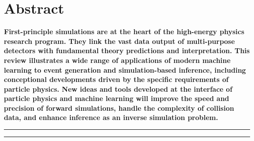 \documentclass[submission,Phys]{SciPost}
\newcommand\snowmass{\begin{center}\rule[-0.2in]{\hsize}{0.01in}\\\rule{\hsize}{0.01in}\\
\vskip 0.1in Submitted to the  Proceedings of the US Community Study\\ 
on the Future of Particle Physics (Snowmass)
\rule{\hsize}{0.01in}\\\rule[+0.2in]{\hsize}{0.01in} \end{center}}
\begin{document}
\section*{Abstract}
         {\bf First-principle simulations are at the heart of the high-energy physics research program. They link the vast data output of multi-purpose detectors with fundamental theory predictions and interpretation. This review illustrates a wide range of applications of modern machine learning to event generation and simulation-based inference, including conceptional developments driven by the specific requirements of particle physics. New ideas and tools developed at the interface of particle physics and machine learning will improve the speed and precision of forward simulations, handle the complexity of collision data, and enhance inference as an inverse simulation problem.}

\bigskip\bigskip\bigskip


\clearpage 

\vspace{10pt}
\noindent\rule{\textwidth}{1pt}
\tableofcontents\thispagestyle{fancy}
\noindent\rule{\textwidth}{1pt}
\vspace{10pt}

\clearpage
\end{document}
